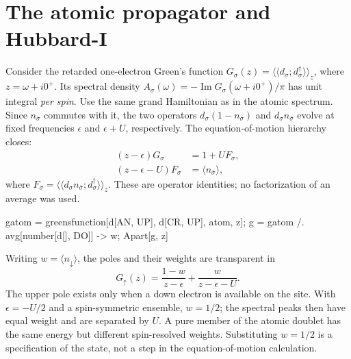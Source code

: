\section{The atomic propagator and Hubbard-I}
Consider the retarded one-electron Green's function
$G_\sigma(z)=\langle\!\langle d_\sigma;d^\dagger_\sigma
\rangle\!\rangle_z$, where $z=\omega+i0^+$. Its spectral density
$A_\sigma(\omega)=-\operatorname{Im}G_\sigma(\omega+i0^+)/\pi$
has unit integral \emph{per spin}. Use the same grand Hamiltonian
as in the atomic spectrum. Since $n_{\bar\sigma}$ commutes with it,
the two operators $d_\sigma(1-n_{\bar\sigma})$ and
$d_\sigma n_{\bar\sigma}$ evolve at fixed frequencies $\epsilon$ and
$\epsilon+U$, respectively. The equation-of-motion hierarchy closes:
\begin{align*}
 (z-\epsilon)G_\sigma &= 1+U F_\sigma,\\
 (z-\epsilon-U)F_\sigma &= \langle n_{\bar\sigma}\rangle ,
\end{align*}
where $F_\sigma=\langle\!\langle d_\sigma n_{\bar\sigma};
d^\dagger_\sigma\rangle\!\rangle_z$. These are operator identities;
no factorization of an average was used.
\begin{wl}
gatom = greensfunction[d[AN, UP], d[CR, UP], atom, z];
g = gatom /. avg[number[d[], DO]] -> w;
Apart[g, z]
\end{wl}
Writing $w=\langle n_{\downarrow}\rangle$, the poles and their weights
are transparent in
\begin{equation}
 G_\uparrow(z)=\frac{1-w}{z-\epsilon}
              +\frac{w}{z-\epsilon-U}.
 \label{eq:atomicG}
\end{equation}
The upper pole exists only when a down electron is available on the
site. With $\epsilon=-U/2$ and a spin-symmetric ensemble, $w=1/2$;
the spectral peaks then have equal weight and are separated by $U$.
A pure member of the atomic doublet has the same energy but different
spin-resolved weights. Substituting $w=1/2$ is a specification of the
state, not a step in the equation-of-motion calculation.
\begin{wl}
ph = Factor[g /. {\[Epsilon] -> -U/2, w -> 1/2}];
{ph, Limit[z ph, z -> Infinity]}
\end{wl}

